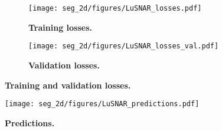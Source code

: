 \begin{figure*}[h]
	\centering
	\begin{subfigure}[b]{0.48\linewidth}
		\texttt{[image: seg\_2d/figures/LuSNAR\_losses.pdf]}
		\caption{\bfseries Training losses.}
		\label{fig:lusnar_losses}
	\end{subfigure}
	\hfill
	\begin{subfigure}[b]{0.48\linewidth}
		\texttt{[image: seg\_2d/figures/LuSNAR\_losses\_val.pdf]}
		\caption{\bfseries Validation losses.}
		\label{fig:lusnar_val_losses}
	\end{subfigure}
	\caption{\bfseries Training and validation losses.}
\end{figure*}


\begin{figure}[t]
	\centering
	\texttt{[image: seg\_2d/figures/LuSNAR\_predictions.pdf]}
	\caption{\bfseries Predictions.}
	\label{fig:lusnar_predictions}
\end{figure}

